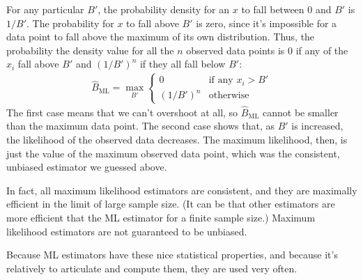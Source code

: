 For any particular $B'$, the probability density for an $x$ to fall between 0
and $B'$ is $1/B'$. The probability for $x$ to fall above $B'$ is zero, since
it's impossible for a data point to fall above the maximum of its own
distribution. Thus, the probability the density value for all the $n$ observed
data points is 0 if any of the $x_i$ fall above $B'$ and $(1/B')^n$ if they all
fall below $B'$:
\begin{align*}
\hat{B}_\text{ML} = \max_{B'} \begin{cases}
0 &\text{if any $x_i > B'$} \\
(1 / B')^n &\text{otherwise}
\end{cases}
\end{align*}
The first case means that we can't overshoot at all, so $\hat{B}_\text{ML}$
cannot be smaller than the maximum data point. The second case shows that,
as $B'$ is increased, the likelihood of the observed data decreases. The maximum
likelihood, then, is just the value of the maximum observed data point, which
was the consistent, unbiased estimator we guessed above.

In fact, all maximum likelihood estimators are consistent, and they are
maximally efficient in the limit of large sample size. (It can be that other
estimators are more efficient that the ML estimator for a finite sample size.)
Maximum likelihood estimators are not guaranteed to be unbiased.

Because ML estimators have these nice statistical properties, and because it's
relatively to articulate and compute them, they are used very often.
